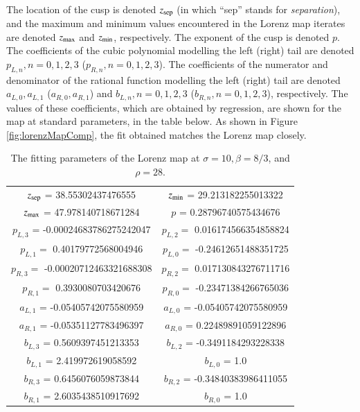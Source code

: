 \documentclass[preprint,12pt]{elsarticle}
\begin{document}
The location of the cusp is denoted $z_{\rm sep}$ (in which ``sep'' stands 
for \emph{separation}), and the maximum and minimum values encountered 
in the Lorenz map iterates are denoted $z_{\rm max}$ and $z_{\rm min}$, respectively. The exponent of the cusp is denoted $p$. The coefficients of the cubic polynomial modelling the left (right) tail are  denoted $p_{L,n}, n = 0,1,2,3$ ($p_{R,n}, n = 0,1,2,3$). The coefficients of the numerator and denominator of the rational function modelling the left (right) tail are denoted $a_{L,0}, a_{L,1}$ ($a_{R,0}, a_{R,1}$) and $b_{L,n}, n=0,1,2,3$ ($b_{R,n}, n=0,1,2,3$), respectively. The values of these coefficients, which are obtained by
regression, are shown for the map at standard parameters, in the table below. As shown in Figure \ref{fig:lorenzMapComp}, the fit obtained matches the Lorenz map closely.
\begin{table}[H]
    \centering
    \begin{tabular}{|c|c|}
    \hline 
         $z_{\rm sep}$ = 38.55302437476555 &
         $z_{\rm min}$ =  29.213182255013322 \\ 
         $z_{\rm max}$ =  47.978140718671284 & 
         $p$ = 0.28796740575434676   \\
         $p_{L,3}$ = -0.00024683786275242047 & $p_{L,2} = $ 
         0.016174566354858824 \\
         $p_{L,1} = $ 0.40179772568004946 & 
         $p_{L, 0}  = $ -0.24612651488351725 \\
         $p_{R,3} = $ -0.00020712463321688308 & 
         $p_{R,2} = $ 0.017130843276711716 \\
         $p_{R, 1} = $ 0.3930080703420676 & 
         $p_{R, 0} = $ -0.23471384266765036 \\
         $a_{L,1}$ = -0.05405742075580959 & $a_{L,0}$ = -0.05405742075580959 \\
         $a_{R,1}$ = -0.05351127783496397 & $a_{R,0}$ = 0.22489891059122896 \\
         $b_{L,3}$ = 0.5609397451213353 & $b_{L,2}$ = -0.3491184293228338 \\  $b_{L,1}$ = 2.419972619058592 & $b_{L,0}$ = 1.0 \\
         $b_{R,3}$ = 0.6456076059873844 & $b_{R,2}$ = -0.34840383986411055 \\ $b_{R,1}$ = 2.6035438510917692 &  $b_{R,0}$ = 1.0 \\
         \hline
    \end{tabular}
    \caption{The fitting parameters of the Lorenz map at $\sigma = 10, \beta = 8/3$, and $\rho = 28.$}
    \label{tab:lorenzFit}
\end{table}
\end{document}
